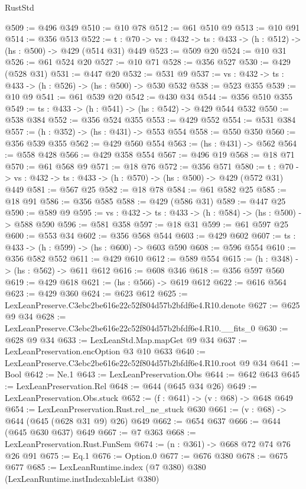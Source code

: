 \begin{lexlean}{RustStd}
\begin{coremodule}
@509 := @496 @349
@510 := @10 @78
@512 := @61 @510 @9
@513 := @10 @91
@514 := @356 @513
@522 := {t : @70} -> {vs : @432} -> {ts : @433} -> (h : @512) -> (hs : @500) -> @429 (@514 @31) @449
@523 := @509 @20
@524 := @10 @31
@526 := @61 @524 @20
@527 := @10 @71
@528 := @356 @527
@530 := @429 (@528 @31)
@531 := @447 @20
@532 := @531 @9
@537 := {vs : @432} -> {ts : @433} -> (h : @526) -> (hs : @500) -> @530 @532
@538 := @523 @355
@539 := @10 @9
@541 := @61 @539 @20
@542 := @430 @34
@544 := @356 @510 @355
@549 := {ts : @433} -> (h : @541) -> (hs : @542) -> @429 @544 @532
@550 := @538 @384
@552 := @356 @524 @355
@553 := @429 @552
@554 := @531 @384
@557 := (h : @352) -> (hs : @431) -> @553 @554
@558 := @550 @350
@560 := @356 @539 @355
@562 := @429 @560 @554
@563 := (hs : @431) -> @562
@564 := @558 @428
@566 := @429 @358 @554
@567 := @496 @19
@568 := @18 @71
@570 := @61 @568 @9
@571 := @18 @76
@572 := @356 @571
@580 := {t : @70} -> {vs : @432} -> {ts : @433} -> (h : @570) -> (hs : @500) -> @429 (@572 @31) @449
@581 := @567 @25
@582 := @18 @78
@584 := @61 @582 @25
@585 := @18 @91
@586 := @356 @585
@588 := @429 (@586 @31)
@589 := @447 @25
@590 := @589 @9
@595 := {vs : @432} -> {ts : @433} -> (h : @584) -> (hs : @500) -> @588 @590
@596 := @581 @358
@597 := @18 @31
@599 := @61 @597 @25
@600 := @553 @34
@602 := @356 @568 @544
@603 := @429 @602
@607 := {ts : @433} -> (h : @599) -> (hs : @600) -> @603 @590
@608 := @596 @554
@610 := @356 @582 @552
@611 := @429 @610
@612 := @589 @554
@615 := (h : @348) -> (hs : @562) -> @611 @612
@616 := @608 @346
@618 := @356 @597 @560
@619 := @429 @618
@621 := (hs : @566) -> @619 @612
@622 := @616 @564
@623 := @429 @360
@624 := @623 @612
@625 := LexLeanPreserve.C3ebc2be616e22c52f804d57b2bfdf6e4.R10.denote
@627 := @625 @9 @34
@628 := LexLeanPreserve.C3ebc2be616e22c52f804d57b2bfdf6e4.R10.__fits_0
@630 := @628 @9 @34
@633 := LexLeanStd.Map.mapGet @9 @34
@637 := LexLeanPreservation.encOption @3 @10 @633
@640 := LexLeanPreserve.C3ebc2be616e22c52f804d57b2bfdf6e4.R10.root @9 @34
@641 := Bool
@642 := Ne.{1}
@643 := LexLeanPreservation.Obs
@644 := @642 @643
@645 := LexLeanPreservation.Rel
@648 := @644 (@645 @34 @26)
@649 := LexLeanPreservation.Obs.stuck
@652 := (f : @641) -> (v : @68) -> @648 @649
@654 := LexLeanPreservation.Rust.rel_ne_stuck @630
@661 := (v : @68) -> @644 (@645 (@628 @31 @9) @26) @649
@662 := @654 @637
@666 := @644 (@645 @630 @637) @649
@667 := @7 @363
@668 := LexLeanPreservation.Rust.FunSem
@674 := (n : @361) -> @668 @72 @74 @76 @26 @91
@675 := Eq.{1}
@676 := Option.{0}
@677 := @676 @380
@678 := @675 @677
@685 := LexLeanRuntime.index (@7 @380) @380 (LexLeanRuntime.instIndexableList @380)

\end{coremodule}
\end{lexlean}
